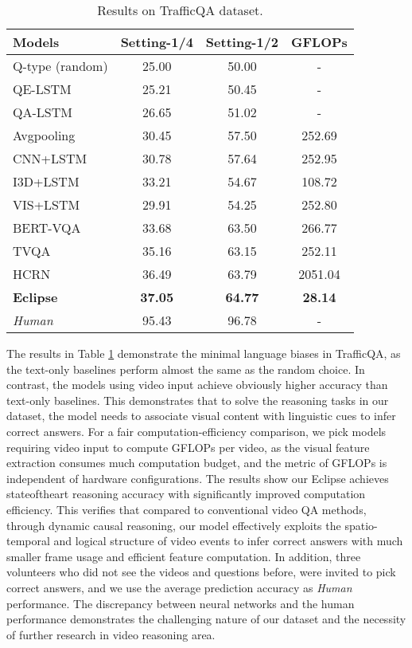 \documentclass[final]{cvpr}
\begin{document}
\begin{table}[t]
\vspace{-0.2cm}
\caption{Results on TrafficQA dataset. 
}
\setlength\abovecaptionskip{-2cm}
\setlength\belowcaptionskip{-2cm}
\setlength{\tabcolsep}{10pt}
\scriptsize
\begin{center}
\begin{tabular}{l|ccc}
\hline
Models & Setting-1/4 & Setting-1/2 & GFLOPs  \\\hline
Q-type (random)& 25.00 & 50.00 & - \\ 
QE-LSTM & 25.21 & 50.45 & - \\ 
QA-LSTM & 26.65 & 51.02 & -  \\ \hline
Avgpooling & 30.45& 57.50 & 252.69 \\ 
CNN+LSTM & 30.78 & 57.64 & 252.95  \\ 
I3D+LSTM & 33.21 & 54.67 & 108.72  \\
VIS+LSTM \cite{ren2015exploring} & 29.91 & 54.25 & 252.80\\
BERT-VQA \cite{Yang_2020_WACV} & 33.68 & 63.50 & 266.77 \\ 
TVQA \cite{lei2018tvqa} & 35.16 & 63.15 & 252.11  \\ 
HCRN \cite{Le_2020_CVPR} & 36.49 & 63.79 & 2051.04 \\ 
\textbf{Eclipse}  & \textbf{37.05} & \textbf{64.77} & \textbf{28.14} \\ \hline
\textit{Human}    &  95.43    & 96.78 & -\\ \hline
\end{tabular}
\end{center}
\label{table:baseline_comparison}
\vspace{-0.5cm}
\end{table}

The results in Table \ref{table:baseline_comparison}
demonstrate the minimal language biases in TrafficQA, as the text-only baselines perform almost the same as the random choice. In contrast, the models using video input achieve obviously higher accuracy than text-only baselines. This demonstrates that to solve the reasoning tasks in our dataset, the model needs to associate visual content with linguistic cues to infer correct answers. For a fair computation-efficiency comparison, we pick models requiring video input to compute GFLOPs per video, as the visual feature extraction consumes much computation budget, and the metric of GFLOPs is independent of hardware configurations. The results show our Eclipse achieves state\text{-}of\text{-}the\text{-}art reasoning accuracy 
with significantly improved computation efficiency. This verifies that compared to conventional video QA  methods, through dynamic causal reasoning, our model effectively exploits the spatio-temporal and logical structure of video events to infer correct answers with much smaller frame usage and efficient feature computation.
In addition, three volunteers who did not see the videos and questions before, were invited to pick correct answers, and we use the average prediction accuracy as \textit{Human} performance. The discrepancy between neural networks and the human performance demonstrates the challenging nature of our dataset and the necessity of further research in video reasoning area.
\end{document}
